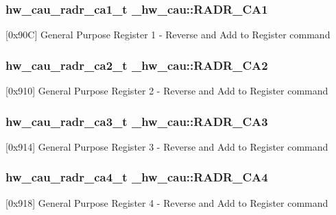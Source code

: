 \subsubsection[{\texorpdfstring{R\+A\+D\+R\+\_\+\+C\+A1}{RADR_CA1}}]{ {\bf hw\+\_\+cau\+\_\+radr\+\_\+ca1\+\_\+t} \+\_\+hw\+\_\+cau\+::\+R\+A\+D\+R\+\_\+\+C\+A1}\hypertarget{struct__hw__cau_afe2446ad24aa846bfb259a6a7e3316bd}{}\label{struct__hw__cau_afe2446ad24aa846bfb259a6a7e3316bd}
\mbox{[}0x90C\mbox{]} General Purpose Register 1 -\/ Reverse and Add to Register command 
\subsubsection[{\texorpdfstring{R\+A\+D\+R\+\_\+\+C\+A2}{RADR_CA2}}]{ {\bf hw\+\_\+cau\+\_\+radr\+\_\+ca2\+\_\+t} \+\_\+hw\+\_\+cau\+::\+R\+A\+D\+R\+\_\+\+C\+A2}\hypertarget{struct__hw__cau_a67dd18bb4a0194ae7a737f0dc269c54d}{}\label{struct__hw__cau_a67dd18bb4a0194ae7a737f0dc269c54d}
\mbox{[}0x910\mbox{]} General Purpose Register 2 -\/ Reverse and Add to Register command 
\subsubsection[{\texorpdfstring{R\+A\+D\+R\+\_\+\+C\+A3}{RADR_CA3}}]{ {\bf hw\+\_\+cau\+\_\+radr\+\_\+ca3\+\_\+t} \+\_\+hw\+\_\+cau\+::\+R\+A\+D\+R\+\_\+\+C\+A3}\hypertarget{struct__hw__cau_a5117f1425b2477a988de21748ab25523}{}\label{struct__hw__cau_a5117f1425b2477a988de21748ab25523}
\mbox{[}0x914\mbox{]} General Purpose Register 3 -\/ Reverse and Add to Register command 
\subsubsection[{\texorpdfstring{R\+A\+D\+R\+\_\+\+C\+A4}{RADR_CA4}}]{ {\bf hw\+\_\+cau\+\_\+radr\+\_\+ca4\+\_\+t} \+\_\+hw\+\_\+cau\+::\+R\+A\+D\+R\+\_\+\+C\+A4}\hypertarget{struct__hw__cau_af3fb1a684268d62d6593e53f5671583f}{}\label{struct__hw__cau_af3fb1a684268d62d6593e53f5671583f}
\mbox{[}0x918\mbox{]} General Purpose Register 4 -\/ Reverse and Add to Register command 
